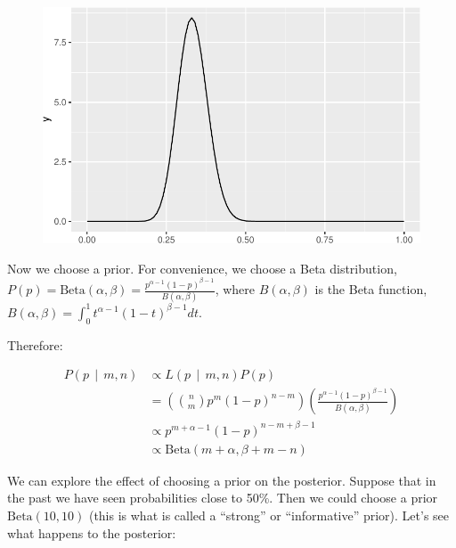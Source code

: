 \documentclass[
  letterpaper,
  DIV=11,
  numbers=noendperiod]{scrreprt}
\begin{document}
\begin{figure}[H]

{\centering \includegraphics{./06-likelihood_files/figure-pdf/unnamed-chunk-5-1.pdf}

}

\end{figure}

Now we choose a prior. For convenience, we choose a Beta distribution,
\(P(p) = \text{Beta}(\alpha, \beta) = \frac{p^{\alpha - 1} (1-p)^{\beta - 1}}{B(\alpha, \beta)}\),
where \(B(\alpha, \beta)\) is the Beta function,
\(B(\alpha, \beta) = \int_0^1 t^{\alpha -1} (1-t)^{\beta - 1} dt\).

Therefore:

\[
\begin{aligned}
P(p \ \ \vert \ \ m,n) & \propto L(p \ \ \vert \ \ m,n) P(p) \\
&= \left(\binom{n}{m} p^m (1-p)^{n-m} \right) \left( \frac{p^{\alpha - 1} (1-p)^{\beta - 1}}{B(\alpha, \beta)} \right)\\
& \propto p^{m+\alpha -1} (1-p)^{n-m + \beta -1} \\
& \propto \text{Beta}(m + \alpha, \beta + m - n)
\end{aligned}
\]

We can explore the effect of choosing a prior on the posterior. Suppose
that in the past we have seen probabilities close to 50\%. Then we could
choose a prior \(\text{Beta}(10,10)\) (this is what is called a
``strong'' or ``informative'' prior). Let's see what happens to the
posterior:
\end{document}
